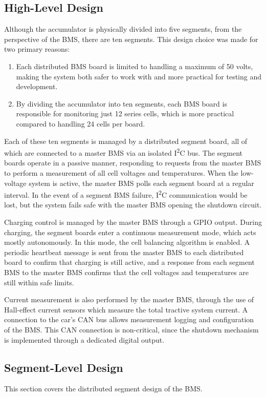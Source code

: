 \documentclass[12pt]{article}
\newcommand{\iic}{I\textsuperscript{2}C}
\begin{document}
\subsection{High-Level Design}
Although the accumulator is physically divided into five segments, from the perspective of the BMS, there are ten segments.
This design choice was made for two primary reasons:
\begin{enumerate}[label=(\arabic*)]
\item Each distributed BMS board is limited to handling a maximum of 50 volts, making the system both safer to work with and more practical for testing and development.
\item By dividing the accumulator into ten segments, each BMS board is responsible for monitoring just 12 series cells, which is more practical compared to handling 24 cells per board.
\end{enumerate}

Each of these ten segments is managed by a distributed segment board, all of which are connected to a master BMS via an isolated \iic{} bus.
The segment boards operate in a passive manner, responding to requests from the master BMS to perform a measurement of all cell voltages and temperatures.
When the low-voltage system is active, the master BMS polls each segment board at a regular interval.
In the event of a segment BMS failure, \iic{} communication would be lost, but the system fails safe with the master BMS opening the shutdown circuit.

Charging control is managed by the master BMS through a GPIO output.
During charging, the segment boards enter a continuous measurement mode, which acts mostly autonomously.
In this mode, the cell balancing algorithm is enabled.
A periodic heartbeat message is sent from the master BMS to each distributed board to confirm that charging is still active, and a response from each segment BMS to the master BMS confirms that the cell voltages and temperatures are still within safe limits.

Current measurement is also performed by the master BMS, through the use of Hall-effect current sensors which measure the total tractive system current.
A connection to the car's CAN bus allows measurement logging and configuration of the BMS.
This CAN connection is non-critical, since the shutdown mechanism is implemented through a dedicated digital output.

\subsection{Segment-Level Design}
This section covers the distributed segment design of the BMS.
\end{document}
